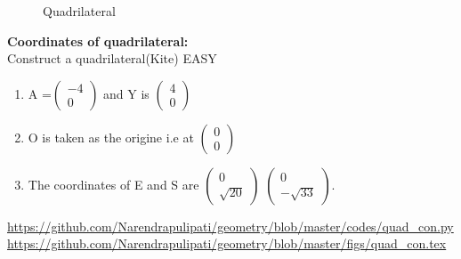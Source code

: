 \begin{frame}{}
\begin{figure}[!ht]
	\begin{center}
		\resizebox{0.6\columnwidth}{!}{}
	\end{center}
	\caption{Quadrilateral}
	\label{}	
\end{figure}
\end{frame}
\begin{frame}
\textbf{Coordinates of quadrilateral:}
\\
Construct a quadrilateral(Kite) EASY\\
\begin{enumerate}
\item A =$\begin{pmatrix} -4\\0 \end{pmatrix}$ and Y is $\begin{pmatrix}  4\\0 \end{pmatrix}$
\item O is taken as the origine i.e at $\begin{pmatrix} 0\\0 \end{pmatrix}$
\item The coordinates of E and S are  $\begin{pmatrix}  0\\ \sqrt{20} \end{pmatrix}$ $\begin{pmatrix} 0\\-\sqrt{33} \end{pmatrix}.$
\end{enumerate}
\url{https://github.com/Narendrapulipati/geometry/blob/master/codes/quad_con.py}
\url{https://github.com/Narendrapulipati/geometry/blob/master/figs/quad_con.tex}
\end{frame}